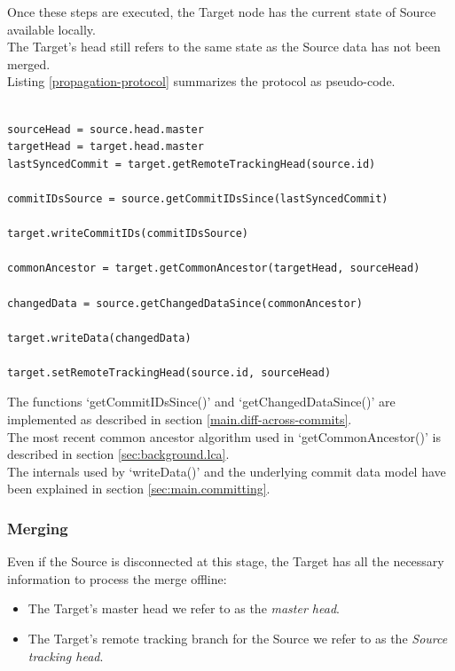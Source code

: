 Once these steps are executed, the Target node has the current state of Source available locally.\\
The Target's head still refers to the same state as the Source data has not been merged.\\

Listing \ref{propagation-protocol} summarizes the protocol as pseudo-code.\\

\begin{lstlisting}[caption=Propagation Protocol, label=propagation-protocol]

sourceHead = source.head.master
targetHead = target.head.master
lastSyncedCommit = target.getRemoteTrackingHead(source.id)

commitIDsSource = source.getCommitIDsSince(lastSyncedCommit)

target.writeCommitIDs(commitIDsSource)

commonAncestor = target.getCommonAncestor(targetHead, sourceHead)

changedData = source.getChangedDataSince(commonAncestor)

target.writeData(changedData)

target.setRemoteTrackingHead(source.id, sourceHead)

\end{lstlisting}

The functions `getCommitIDsSince()' and `getChangedDataSince()' are implemented as described in section \ref{main.diff-across-commits}.\\
The most recent common ancestor algorithm used in `getCommonAncestor()' is described in section \ref{sec:background.lca}.\\
The internals used by `writeData()' and the underlying commit data model have been explained in section \ref{sec:main.committing}.

\subsubsection{Merging}
Even if the Source is disconnected at this stage, the Target has all the necessary information to process the merge offline:\\

\begin{itemize}
\item The Target's master head we refer to as the \emph{master head}.\\
\item The Target's remote tracking branch for the Source we refer to as the \emph{Source tracking head}.
\end{itemize}

